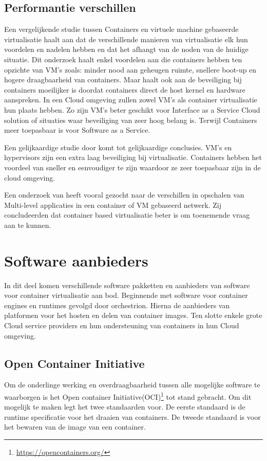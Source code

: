 \subsection{Performantie verschillen}
Een vergelijkende studie tussen Containers en virtuele machine gebaseerde virtualisatie\autocite{Yadav2018} haalt aan dat de verschillende manieren van virtualisatie elk hun voordelen en nadelen hebben en dat het afhangt van de noden van de huidige situatie. Dit onderzoek haalt enkel voordelen aan die containers hebben ten opzichte van VM’s zoals: minder nood aan geheugen ruimte, snellere boot-up en hogere draagbaarheid van containers. Maar haalt ook aan de beveiliging bij containers moeilijker is doordat containers direct de host kernel en hardware aanspreken. In een Cloud omgeving zullen zowel VM’s als container virtualisatie hun plaats hebben. Zo zijn VM’s beter geschikt voor Interface as a Service Cloud solution of situaties waar beveiliging van zeer hoog belang is. Terwijl Containers meer toepasbaar is voor Software as a Service.

Een gelijkaardige studie door \textcite{Eder2016} komt tot gelijkaardige conclusies. VM’s en hypervisors zijn een extra laag beveiliging bij virtualisatie. Containers hebben het voordeel van sneller en eenvoudiger te zijn waardoor ze zeer toepasbaar zijn in de cloud omgeving.

Een onderzoek van \textcite{Abdullah2019} heeft vooral gezocht naar de verschillen in opschalen van Multi-level applicaties in een container of VM gebaseerd netwerk. Zij concludeerden dat container based virtualisatie beter is om toenemende vraag aan te kunnen.


\section{Software aanbieders}
In dit deel komen verschillende software pakketten en aanbieders van software voor container virtualisatie aan bod. Beginnende met software voor container engines en runtimes gevolgd door orchestrion.  Hierna de aanbieders van platformen voor het hosten en delen van container images. Ten slotte enkele grote Cloud service providers en hun ondersteuning van containers in hun Cloud omgeving.


\subsection{Open Container Initiative}
Om de onderlinge werking en overdraagbaarheid tussen alle mogelijke software te waarborgen is het Open container Initiative(OCI)\footnote{\url{https://opencontainers.org/}} tot stand gebracht. Om dit mogelijk te maken legt het twee standaarden voor. De eerste standaard is de runtime specificatie voor het draaien van containers. De tweede standaard is voor het bewaren van de image van een container.


